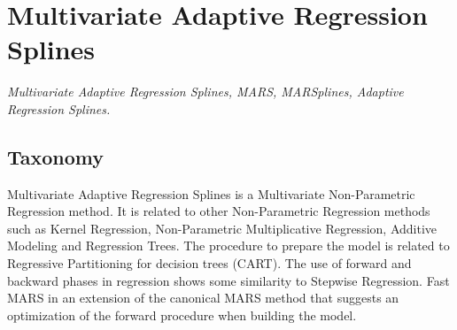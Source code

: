 
\section{Multivariate Adaptive Regression Splines} 
\label{sec:mars}

\emph{Multivariate Adaptive Regression Splines, MARS, MARSplines, Adaptive Regression Splines.}

\subsection{Taxonomy}
Multivariate Adaptive Regression Splines is a Multivariate Non-Parametric Regression method.
It is related to other Non-Parametric Regression methods such as Kernel Regression, Non-Parametric Multiplicative Regression, Additive Modeling and Regression Trees. The procedure to prepare the model is related to Regressive Partitioning for decision trees (CART). The use of forward and backward phases in regression shows some similarity to Stepwise Regression.
Fast MARS in an extension of the canonical MARS method that suggests an optimization of the forward procedure when building the model.

